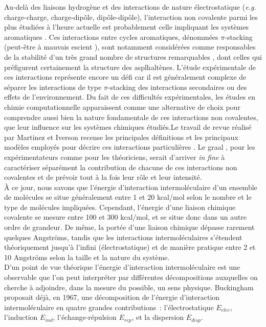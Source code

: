 	Au-delà des liaisons hydrogène et des interactions de nature électrostatique (\textit{e.g.} charge-charge, charge-dipôle, dipôle-dipôle), l’interaction non covalente parmi les plus étudiées à l’heure actuelle est probablement celle impliquant les systèmes aromatiques \cite{grimme2008special}. Ces interactions entre cycles aromatiques, dénommées \og $\pi$-stacking \fg{} (peut-être à mauvais escient \cite{martinez2012rethinking}), sont notamment considérées comme responsables de la stabilité d’un très grand nombre de structures remarquables \cite{mcgaughey1998pi}, dont celles qui préfigurent certainement la structure des asplhaltènes. L’étude expérimentale de ces interactions représente encore un défi car il est généralement complexe de séparer les interactions de type $\pi$-stacking des interactions secondaires ou des effets de l’environnement. Du fait de ces difficultés expérimentales, les études en chimie computationnelle apparaissent comme une alternative de choix pour comprendre aussi bien la nature fondamentale de ces interactions non covalentes, que leur influence sur les systèmes chimiques étudiés.Le travail de revue réalisé par Martinez et Iverson recense les principales définitions et les principaux modèles employés pour décrire ces interactions particulières \cite{martinez2012rethinking}.
	Le \og graal \fg{}, pour les expérimentateurs comme pour les théoriciens, serait d’arriver \textit{in fine} à caractériser séparément la contribution de chacune de ces interactions non covalentes et de prévoir tout à la fois leur rôle et leur intensité.\\
	
	À ce jour, nous savons que l’énergie d'interaction intermoléculaire d'un ensemble de molécules se situe généralement entre 1 et 20 kcal/mol selon le nombre et le type de molécules impliquées. Cependant, l'énergie d'une liaison chimique covalente se mesure entre 100 et 300 kcal/mol, et se situe donc dans un autre ordre de grandeur. De même, la portée d’une liaison chimique dépasse rarement quelques Angströms, tandis que les interactions intermoléculaires s'étendent théoriquement jusqu'à l'infini (électrostatique) et de manière pratique entre 2 et 10 Angströms selon la taille et la nature du système.\\
	
	D’un point de vue théorique l’énergie d’interaction intermoléculaire est une observable que l’on peut interpréter par différentes décompositions auxquelles on cherche à adjoindre, dans la mesure du possible, un sens physique. Buckingham \cite{buckingham1967permanent} proposait déjà, en 1967, une décomposition de l’énergie d’interaction intermoléculaire en quatre grandes contributions : l’électrostatique $E_{elec}$, l’induction $E_{ind}$, l’échange-répulsion $E_{rep}$, et la dispersion $E_{disp}$.\\
	
